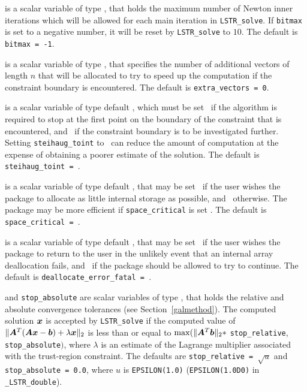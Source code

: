 \documentclass{galahad}
\newcommand{\packagename}{LS\-TR}
\newcommand{\fullpackagename}{\libraryname\_\packagename}
\begin{document}
\begin{description}
 is a scalar variable of type \integer, that holds the
maximum number of Newton inner iterations which will be allowed for each
main iteration in {\tt \packagename\_solve}.
If {\tt bitmax} is set to a negative number, it will be reset by
{\tt \packagename\_solve} to $10$.
The default is {\tt bitmax = -1}.

 is a scalar variable of type \integer,
that specifies the number of additional vectors of length $n$
that will be allocated to try to speed up the computation if the
constraint boundary  is encountered.
The default is {\tt extra\_vectors = 0}.

 is a scalar variable of type default \logical,
which must be set \true\ if the algorithm is required to stop at
the first point on the boundary of the constraint that is encountered,
and \false\  if the constraint boundary is to be investigated
further.  Setting {\tt steihaug\_toint} to \true\ can reduce the
amount of computation at the expense of obtaining a poorer estimate of
the solution.
The default is {\tt steihaug\_toint = \true}.

 is a scalar variable of type default \logical, that
may be set \true\ if the user wishes the package to allocate as little
internal storage as possible, and \false\ otherwise. The package may
be more efficient if {\tt space\_critical} is set \false.
The default is {\tt space\_critical = \false}.

 is a scalar variable of type default \logical,
that may be set \true\ if the user wishes the package to return to the user
in the unlikely event that an internal array deallocation fails,
and \false\ if the package should be allowed to try to continue.
The default is {\tt deallocate\_error\_fatal = \false}.

 and {\tt stop\_absolute} are scalar variables of type
\realdp, that holds the
relative and absolute convergence tolerances (see Section~\ref{galmethod}).
The computed solution ${\bm{x}}$ is accepted by {\tt \packagename\_solve}
if the computed value of
$\|{\bm{A}}^T ( {\bm{A}} {\bm{x}} - {\bm{b}} ) + \lambda {\bm{x}}\|_2$
is less than or equal
to $\max (\| {\bm{A}}^T {\bm{b}} \|_2 \ast$ {\tt stop\_relative},
{\tt stop\_absolute}$)$, where $\lambda$ is an estimate of the Lagrange
multiplier associated with the trust-region constraint.
The defaults are {\tt stop\_relative = $\sqrt{u}$} and
{\tt stop\_absolute = 0.0},
where $u$ is {\tt EPSILON(1.0)} ({\tt EPSILON(1.0D0)} in
{\tt \fullpackagename\_double}).


\end{description}
\end{document}
